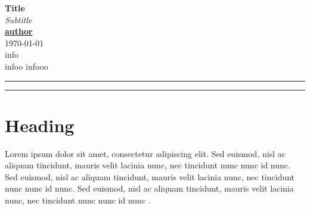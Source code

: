 \documentclass[12pt, a4paper]{article}
\begin{document}
\begin{center}
	{{\Large \textbf{Title}}\\ \textit{Subtitle}}\\
	\vspace{0.4cm}
	\normalsize
	\underline{\textbf{author}} \\
	\vspace{0.1cm}
	\today\\
	\medskip
	\small{info}\\
	\medskip\vspace{0,5cm}
	\small{infoo} \hspace*{3cm} \small{infooo}\\
	\medskip
	\normalsize
\end{center}
\medskip

{\color{gray}\hrule}

\tableofcontents

\medskip

{\color{gray}\hrule}
\bigskip
\thispagestyle{empty}

\newpage
\setcounter{page}{1}

\section{Heading}

Lorem ipsum dolor sit amet, consectetur adipiscing elit. Sed euismod, nisl ac aliquam tincidunt, mauris velit lacinia nunc, nec tincidunt nunc nunc id nunc. Sed euismod, nisl ac aliquam tincidunt, mauris velit lacinia nunc, nec tincidunt nunc nunc id nunc. Sed euismod, nisl ac aliquam tincidunt, mauris velit lacinia nunc, nec tincidunt nunc nunc id nunc \parencite{luhmann1984}.


\printbibliography
\end{document}
